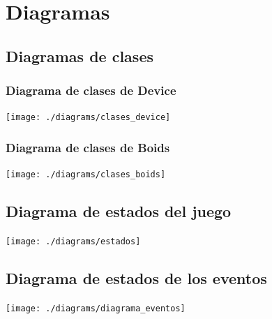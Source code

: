 \documentclass[a4paper,10pt]{article}
\begin{document}
\cleardoublepage



\appendix
\section{Diagramas}
\subsection{Diagramas de clases}
\subsubsection{Diagrama de clases de Device}
\begin{center}
 \texttt{[image: ./diagrams/clases\_device]}
\end{center}

\subsubsection{Diagrama de clases de Boids}
\begin{center}
 \texttt{[image: ./diagrams/clases\_boids]}
\end{center}
\cleardoublepage

\subsection{Diagrama de estados del juego}
\begin{center}
 \texttt{[image: ./diagrams/estados]}
\end{center}

\subsection{Diagrama de estados de los eventos}
\begin{center}
 \texttt{[image: ./diagrams/diagrama\_eventos]}
\end{center}
\cleardoublepage


\end{document}
